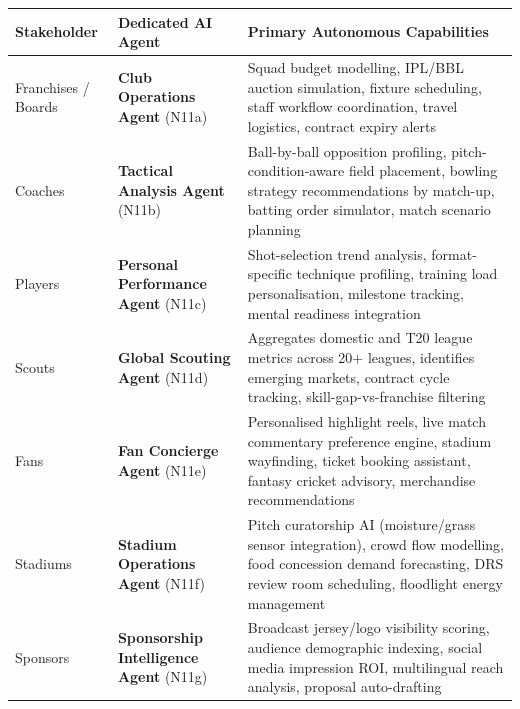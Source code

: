 \documentclass[11pt,a4paper]{article}
\begin{document}
\begin{center}
\footnotesize
\renewcommand{\arraystretch}{1.25}
\begin{tabular}{@{}>{\raggedright\arraybackslash}p{2.4cm}
                  >{\raggedright\arraybackslash}p{3.2cm}
                  >{\raggedright\arraybackslash}p{9.0cm}@{}}
\toprule
\textbf{Stakeholder} & \textbf{Dedicated AI Agent} & \textbf{Primary Autonomous Capabilities} \\
\midrule
Franchises / Boards & \textbf{Club Operations Agent} (N11a) & Squad budget modelling, IPL/BBL auction simulation, fixture scheduling, staff workflow coordination, travel logistics, contract expiry alerts \\
Coaches & \textbf{Tactical Analysis Agent} (N11b) & Ball-by-ball opposition profiling, pitch-condition-aware field placement, bowling strategy recommendations by match-up, batting order simulator, match scenario planning \\
Players & \textbf{Personal Performance Agent} (N11c) & Shot-selection trend analysis, format-specific technique profiling, training load personalisation, milestone tracking, mental readiness integration \\
Scouts & \textbf{Global Scouting Agent} (N11d) & Aggregates domestic and T20 league metrics across 20$+$ leagues, identifies emerging markets, contract cycle tracking, skill-gap-vs-franchise filtering \\
Fans & \textbf{Fan Concierge Agent} (N11e) & Personalised highlight reels, live match commentary preference engine, stadium wayfinding, ticket booking assistant, fantasy cricket advisory, merchandise recommendations \\
Stadiums & \textbf{Stadium Operations Agent} (N11f) & Pitch curatorship AI (moisture/grass sensor integration), crowd flow modelling, food concession demand forecasting, DRS review room scheduling, floodlight energy management \\
Sponsors & \textbf{Sponsorship Intelligence Agent} (N11g) & Broadcast jersey/logo visibility scoring, audience demographic indexing, social media impression ROI, multilingual reach analysis, proposal auto-drafting \\

\end{tabular}
\end{center}
\end{document}

